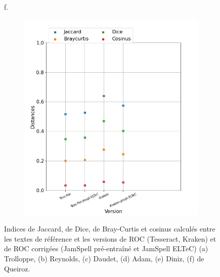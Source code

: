 \begin{figure}
\begin{minipage}{7cm}
\begin{subfigure}{0.99\textwidth}
  \vspace{-0.3cm}
  \label{fig:Diniz_DIST_KRAKENBASE_LG}
  \end{subfigure}
  \end{minipage} 
\begin{minipage}{7cm}
f.\
  \begin{subfigure}{0.99\textwidth}
  \includegraphics[height=.99\textwidth]{IMAGES/ELTeC_DISTANCES_spaCy3.5.1/DE-QUEIROS-CRIME-graph-dist-spaCy3.5.1-txt.png} 
  \vspace{-0.3cm}
  \label{fig:DE-QUEIROS-CRIME_DIST_KRAKENBASE_LG}
  \end{subfigure}
  \end{minipage}


\caption{Indices de Jaccard, de Dice, de Bray-Curtis et cosinus calculés entre les textes de référence et les versions de ROC (Tesseract, Kraken) et de ROC corrigées (JamSpell pré-entraîné et JamSpell ELTeC) (a) Trolloppe, (b) Reynolds, (c) Daudet, (d) Adam, (e) Diniz, (f) de Queiroz.}
\label{fig:distances-textes}
\end{figure}
